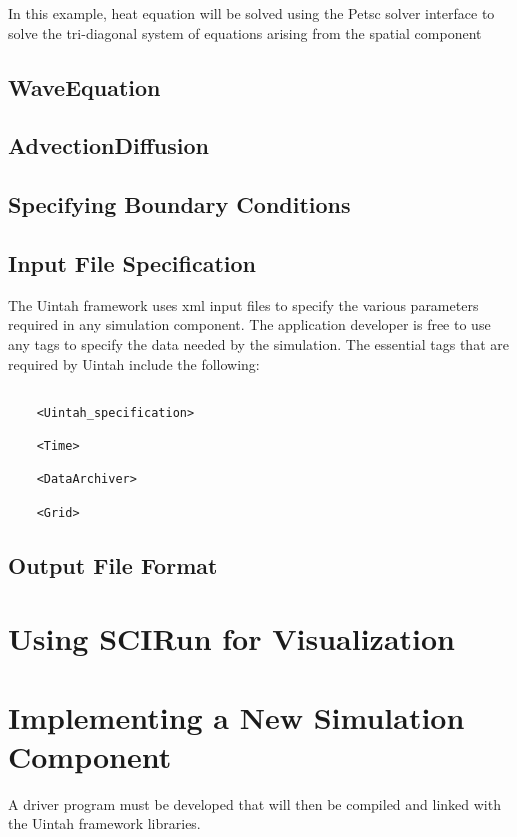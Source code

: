 \documentclass[12pt]{report}
\begin{document}
In this example, heat equation will be solved using the Petsc solver
interface to solve the tri-diagonal system of equations arising from
the spatial component

\section{WaveEquation}

\section{AdvectionDiffusion}

\section{Specifying Boundary Conditions}

\section{Input File Specification}

The Uintah framework uses xml input files to specify the various
parameters required in any simulation component.  The application
developer is free to use any tags to specify the data needed by the
simulation.  The essential tags that are required by Uintah include
the following:

\begin{verbatim}

	<Uintah_specification>

	<Time>

	<DataArchiver>

	<Grid>

\end{verbatim}

\section{Output File Format}


\chapter{Using SCIRun for Visualization}


\chapter{Implementing a New Simulation Component}

A driver program must be developed that will then be compiled and
linked with the Uintah framework libraries.
\end{document}
